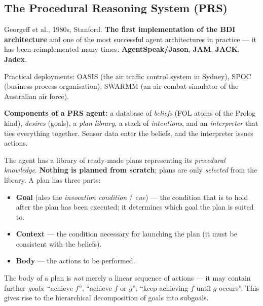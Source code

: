 \documentclass[11pt,a4paper]{article}
\theoremstyle{definition}
\providecommand{\uv}[1]{``#1''}
\begin{document}
\subsection{The Procedural Reasoning System (PRS)}
\label{ssec:prs}

\begin{defbox}
Georgeff et al., 1980s, Stanford. \textbf{The first implementation of the BDI architecture} and one
of the most successful agent architectures in practice --- it has been reimplemented many times:
\textbf{AgentSpeak/Jason}, \textbf{JAM}, \textbf{JACK}, \textbf{Jadex}.

Practical deployments: OASIS (the air traffic control system in Sydney), SPOC (business process
organisation), SWARMM (an air combat simulator of the Australian air force).
\end{defbox}

\textbf{Components of a PRS agent:} a database of \emph{beliefs} (FOL atoms of the Prolog kind),
\emph{desires} (goals), a \emph{plan library}, a stack of \emph{intentions}, and an
\emph{interpreter} that ties everything together. Sensor data enter the beliefs, and the interpreter
issues actions.

\begin{defbox}
The agent has a library of ready-made plans representing its \emph{procedural knowledge}.
\textbf{Nothing is planned from scratch}; plans are only \emph{selected} from the library. A plan
has three parts:
\begin{itemize}
\item \textbf{Goal} (also the \emph{invocation condition} / \emph{cue}) --- the condition that is to
  hold after the plan has been executed; it determines which goal the plan is suited to.
\item \textbf{Context} --- the condition necessary for launching the plan (it must be consistent
  with the beliefs).
\item \textbf{Body} --- the actions to be performed.
\end{itemize}
The body of a plan is \emph{not} merely a linear sequence of actions --- it may contain further
\emph{goals}: \uv{achieve $f$}, \uv{achieve $f$ or $g$}, \uv{keep achieving $f$ until $g$ occurs}.
This gives rise to the hierarchical decomposition of goals into subgoals.
\end{defbox}
\end{document}
